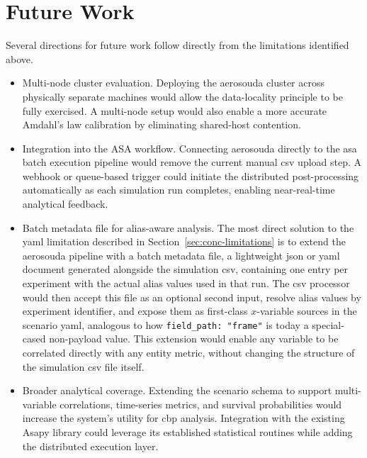 \section{Future Work}
\label{sec:conc-future}

Several directions for future work follow directly from the limitations identified above.

\begin{itemize}
    \item Multi-node cluster evaluation.  Deploying the \gls{aerosouda} cluster
          across physically separate machines would allow the data-locality principle to be
          fully exercised.  A multi-node setup would also enable a more accurate Amdahl's law
          calibration by eliminating shared-host contention.

    \item Integration into the ASA workflow.  Connecting \gls{aerosouda} directly
          to the \gls{asa} batch execution pipeline would remove the current manual \gls{csv}
          upload step.  A webhook or queue-based trigger could initiate the distributed
          post-processing automatically as each simulation run completes, enabling near-real-time
          analytical feedback.

    \item Batch metadata file for alias-aware analysis.
          The most direct solution to the \gls{yaml} limitation described in
          Section~\ref{sec:conc-limitations} is to extend the \gls{aerosouda} pipeline
          with a batch metadata file, a lightweight \gls{json} or \gls{yaml}
          document generated alongside the simulation \gls{csv}, containing one entry per
          experiment with the actual alias values used in that run.
          \noindent The \gls{csv} processor would then accept this file as an optional
          second input, resolve alias values by experiment identifier, and expose them
          as first-class \(x\)-variable sources in the scenario \gls{yaml}, analogous
          to how \texttt{field\_path: "frame"} is today a special-cased non-payload
          value.  This extension would enable any variable to be correlated directly
          with any entity metric, without changing the structure of the simulation
          \gls{csv} file itself.

    \item Broader analytical coverage.  Extending the scenario schema to support
          multi-variable correlations, time-series metrics, and survival probabilities would
          increase the system's utility for \gls{cbp} analysis.  Integration with the
          existing Asapy library \parencite{dantas2024asapy} could leverage its established
          statistical routines while adding the distributed execution layer.


\end{itemize}
